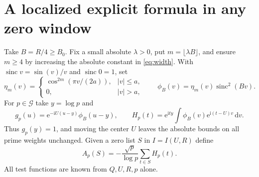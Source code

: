 \documentclass[11pt]{article}
\newcommand{\me}{\mathrm e}
\newcommand{\ii}{\mathrm i}
\newcommand{\dd}{\,\mathrm d}
\newcommand{\sinc}{\operatorname{sinc}}
\newcommand{\GG}{\mathcal G}
\begin{document}
\section{A localized explicit formula in any zero window}
Take $B=R/4\ge B_0$. Fix a small absolute $\lambda>0$, put $m=\lfloor\lambda B\rfloor$, and ensure $m\ge4$ by increasing the absolute constant in \eqref{eq:width}. With $\sinc v=\sin(v)/v$ and $\sinc 0=1$, set
\[
 \eta_m(v)=\begin{cases}\cos^{2m}(\pi v/(2a)),& |v|\le a,\\0,&|v|>a,\end{cases}
 \qquad \phi_B(v)=\eta_m(v)\sinc^2(Bv).
\]
For $p\in\GG$ take $y=\log p$ and
\begin{equation}
 g_p(u)=\me^{-\ii U(u-y)}\phi_B(u-y),\qquad
 H_p(t)=\me^{\ii t y}\int\phi_B(v)\me^{\ii(t-U)v}\dd v.\label{eq:probe}
\end{equation}
Thus $g_p(y)=1$, and moving the center $U$ leaves the absolute bounds on all prime weights unchanged. Given a zero list $S$ in $I=I(U,R)$ define
\begin{equation}
 A_p(S)=-\frac{\sqrt p}{\log p}\sum_{t\in S} H_p(t).\label{eq:read}
\end{equation}
All test functions are known from $Q,U,R,p$ alone.
\end{document}
